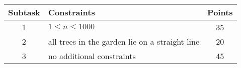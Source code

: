 \documentclass[10pt]{article}
\begin{document}
    \begin{center}
        \begin{tabular}{ |c|p{9cm}|c| }
            \hline
            \textbf{Subtask} & \textbf{Constraints} & \textbf{Points}\\
            \hline
            1 & $1\leq n\leq 1000$ & 35\\
            \hline
            2 & all trees in the garden lie on a straight line & 20\\
            \hline
            3 & no additional constraints & 45\\
            \hline
        \end{tabular}
    \end{center}
    
\end{document}

